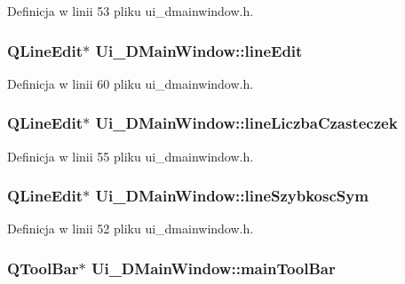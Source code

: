 Definicja w linii 53 pliku ui\-\_\-dmainwindow.\-h.

\hypertarget{class_ui___d_main_window_a26b955a365ed5865f327921708f1a72f}{
\subsubsection[{line\-Edit}]{\setlength{\rightskip}{0pt plus 5cm}Q\-Line\-Edit$\ast$ Ui\-\_\-\-D\-Main\-Window\-::line\-Edit}}\label{class_ui___d_main_window_a26b955a365ed5865f327921708f1a72f}


Definicja w linii 60 pliku ui\-\_\-dmainwindow.\-h.

\hypertarget{class_ui___d_main_window_a49c95cda7e035087a4367514e5540298}{
\subsubsection[{line\-Liczba\-Czasteczek}]{\setlength{\rightskip}{0pt plus 5cm}Q\-Line\-Edit$\ast$ Ui\-\_\-\-D\-Main\-Window\-::line\-Liczba\-Czasteczek}}\label{class_ui___d_main_window_a49c95cda7e035087a4367514e5540298}


Definicja w linii 55 pliku ui\-\_\-dmainwindow.\-h.

\hypertarget{class_ui___d_main_window_a73bafa5343a8e3cb7cd673a24be76008}{
\subsubsection[{line\-Szybkosc\-Sym}]{\setlength{\rightskip}{0pt plus 5cm}Q\-Line\-Edit$\ast$ Ui\-\_\-\-D\-Main\-Window\-::line\-Szybkosc\-Sym}}\label{class_ui___d_main_window_a73bafa5343a8e3cb7cd673a24be76008}


Definicja w linii 52 pliku ui\-\_\-dmainwindow.\-h.

\hypertarget{class_ui___d_main_window_a2e1da3781ee1e5913b25b85f4c29b97f}{
\subsubsection[{main\-Tool\-Bar}]{\setlength{\rightskip}{0pt plus 5cm}Q\-Tool\-Bar$\ast$ Ui\-\_\-\-D\-Main\-Window\-::main\-Tool\-Bar}}\label{class_ui___d_main_window_a2e1da3781ee1e5913b25b85f4c29b97f}


